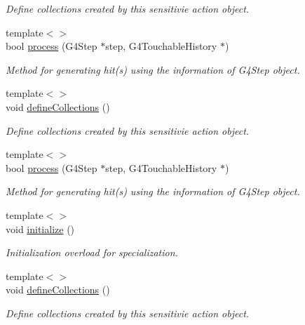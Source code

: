 \begin{DoxyCompactItemize}
\begin{DoxyCompactList}\small\item\em Define collections created by this sensitivie action object. \end{DoxyCompactList}\item 
{\footnotesize template$<$$>$ }\\bool \hyperlink{class_d_d4hep_1_1_simulation_1_1_geant4_sensitive_action_a50bfc45c3c70ee5e944dfb06085b297c}{process} (G4\+Step $\ast$step, G4\+Touchable\+History $\ast$)
\begin{DoxyCompactList}\small\item\em Method for generating hit(s) using the information of G4\+Step object. \end{DoxyCompactList}\item 
{\footnotesize template$<$$>$ }\\void \hyperlink{class_d_d4hep_1_1_simulation_1_1_geant4_sensitive_action_ac21d5f2e63b47e87de641e3920d245e8}{define\+Collections} ()
\begin{DoxyCompactList}\small\item\em Define collections created by this sensitivie action object. \end{DoxyCompactList}\item 
{\footnotesize template$<$$>$ }\\bool \hyperlink{class_d_d4hep_1_1_simulation_1_1_geant4_sensitive_action_a8a81f39616ed1de4b54b57f3f719320f}{process} (G4\+Step $\ast$step, G4\+Touchable\+History $\ast$)
\begin{DoxyCompactList}\small\item\em Method for generating hit(s) using the information of G4\+Step object. \end{DoxyCompactList}\item 
{\footnotesize template$<$$>$ }\\void \hyperlink{class_d_d4hep_1_1_simulation_1_1_geant4_sensitive_action_af2f8b12bf21623f0ab2c0f409e3921fd}{initialize} ()
\begin{DoxyCompactList}\small\item\em Initialization overload for specialization. \end{DoxyCompactList}\item 
{\footnotesize template$<$$>$ }\\void \hyperlink{class_d_d4hep_1_1_simulation_1_1_geant4_sensitive_action_a6faf8e3de0d88a7a7f2db664300718ad}{define\+Collections} ()
\begin{DoxyCompactList}\small\item\em Define collections created by this sensitivie action object. \end{DoxyCompactList}\item 

\end{DoxyCompactItemize}

